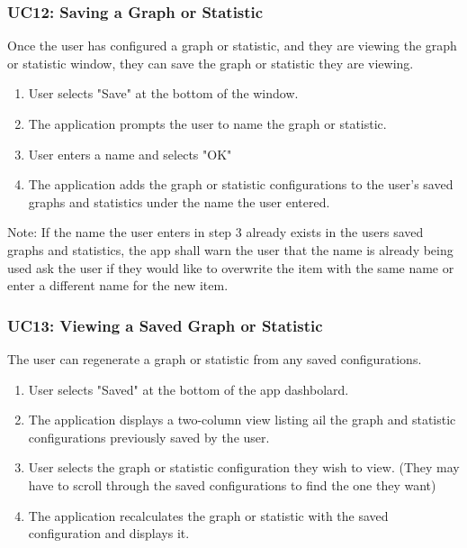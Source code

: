 \documentclass[12pt,oneside,letterpaper]{article}
\begin{document}
\renewcommand{\enumii}{\arabic{\enumii}}
\subsubsection{\label{Saving a Graph or Statistic}UC12: Saving a Graph or Statistic}
Once the user has configured a graph or statistic, and they are viewing the graph or statistic window, they can save the graph or statistic they are viewing.
\begin{enumerate}
\item User selects "Save" at the bottom of the window.
\item The application prompts the user to name the graph or statistic.
\item User enters a name and selects "OK"
\item The application adds the graph or statistic configurations to the user's saved graphs and statistics under the name the user entered.
\end{enumerate}
Note: If the name the user enters in step 3 already exists in the users saved graphs and statistics, the app shall warn the user that the name is already being used ask the user if they would like to overwrite the item with the same name or enter a different name for the new item.

\renewcommand{\enumii}{\arabic{\enumii}}
\subsubsection{\label{Viewing a Saved Graph or Statistic}UC13: Viewing a Saved Graph or Statistic}
The user can regenerate a graph or statistic from any saved configurations.
\begin{enumerate}
\item User selects "Saved" at the bottom of the app dashbolard.
\item The application displays a two-column view listing ail the graph and statistic configurations previously saved by the user.
\item User selects the graph or statistic configuration they wish to view. (They may have to scroll through the saved configurations to find the one they want)
\item The application recalculates the graph or statistic with the saved configuration and displays it.
\end{enumerate}

\renewcommand{\enumii}{\arabic{\enumii}}
\end{document}
